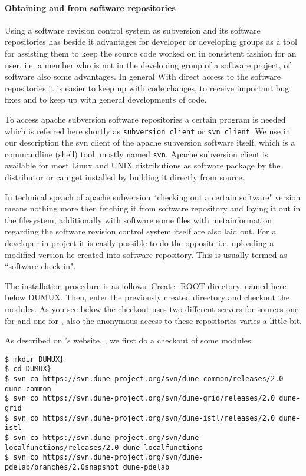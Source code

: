\paragraph{Obtaining \Dune and \Dumux from software repositories} 

Using a software revision control system as subversion and its software repositories has beside it advantages for developer or developing groups as a tool for assisting them to keep the source code worked on in consistent fashion for an user, i.e. a member who is not in the developing group of a software project, of software also some advantages.
In general With direct access to the software repositories it is easier to keep up with code changes, to receive important bug fixes and to keep up with general developments of code.

To access apache subversion software repositories a certain program is needed which is referred here shortly as \texttt{subversion client} or \texttt{svn client}. We use in our description the svn client of the apache subversion software itself, which is a commandline (shell) tool, mostly named \texttt{svn}. 
Apache subversion client is available for most Linux and UNIX distributions as software package by the distributor or can get installed by building it directly from source.

In technical speach of apache subversion ``checking out a certain software" version means nothing more then fetching 
it from software repository and laying it out in the filesystem, additionally with software some files with metainformation regarding the software revision control system itself are also laid out.
For a developer in \Dumux project it is easily possible to do the opposite i.e. uploading a modified version he created into software repository. This is usually termed as ``software check in".

The installation procedure is as follows:
Create {\Dune}-ROOT directory, named here below DUMUX.
Then, enter the previously created directory and checkout the modules. 
As you see below the checkout uses two different servers for sources one for \Dune and one for \Dumux, also the 
anonymous access to these repositories varies a little bit. 

As described on \Dune's website, \cite{DUNE-DOWNLOAD-SVN}, we first do a checkout of some \Dune modules:

\begin{lstlisting}[style=Bash]
$ mkdir DUMUX}
$ cd DUMUX}
$ svn co https://svn.dune-project.org/svn/dune-common/releases/2.0 dune-common
$ svn co https://svn.dune-project.org/svn/dune-grid/releases/2.0 dune-grid
$ svn co https://svn.dune-project.org/svn/dune-istl/releases/2.0 dune-istl
$ svn co https://svn.dune-project.org/svn/dune-localfunctions/releases/2.0 dune-localfunctions
$ svn co https://svn.dune-project.org/svn/dune-pdelab/branches/2.0snapshot dune-pdelab
\end{lstlisting}

